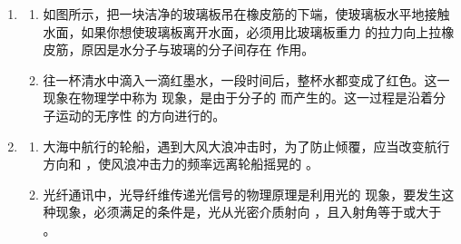 \documentclass[\gkver]{gaokaozhenti}
\begin{document}
\begin{enumerate}

{在绕月圆轨道上，卫星周期与卫星质量有关}
{卫星受月球的引力与它到月球中心距离的平方成反比}
{在绕月圆轨道上，卫星受地球的引力大于受月球的引力}


\item
\begin{enumerate}
	\item
	如图所示，把一块洁净的玻璃板吊在橡皮筋的下端，使玻璃板水平地接触水面，如果你想使玻璃板离开水面，必须用比玻璃板重力  的拉力向上拉橡皮筋，原因是水分子与玻璃的分子间存在  作用。
	\item
	往一杯清水中滴入一滴红墨水，一段时间后，整杯水都变成了红色。这一现象在物理学中称为  现象，是由于分子的  而产生的。这一过程是沿着分子运动的无序性  的方向进行的。
\end{enumerate}




\item
\begin{enumerate}
	\item
	大海中航行的轮船，遇到大风大浪冲击时，为了防止倾覆，应当改变航行方向和 ，使风浪冲击力的频率远离轮船摇晃的 。
	\item
	光纤通讯中，光导纤维传递光信号的物理原理是利用光的  现象，要发生这种现象，必须满足的条件是，光从光密介质射向 ，且入射角等于或大于 。
\end{enumerate}


\end{enumerate}
\end{document}
